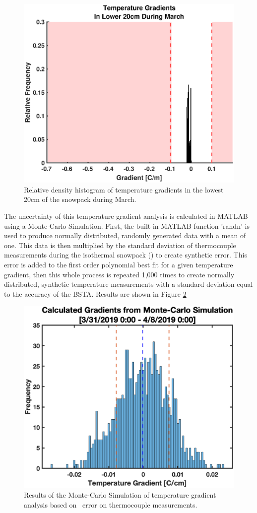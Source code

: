    \begin{figure}[H]
    \centering
    \includegraphics[width=0.7\linewidth]{figures/TempGrad/Mar_L20_RDH.eps}
    \caption{Relative density histogram of temperature gradients in the lowest 20cm of the snowpack during March.}
    \label{fig:Mar_L20_RDH}
 \end{figure}
 
The uncertainty of this temperature gradient analysis is calculated in MATLAB using a Monte-Carlo Simulation. First, the built in MATLAB function 'randn' is used to produce normally distributed, randomly generated data with a mean of one. This data is then multiplied by the standard deviation of thermocouple measurements during the isothermal snowpack (\isostd) to create synthetic error. This error is added to the first order polynomial best fit for a given temperature gradient, then this whole process is repeated 1,000 times to create normally distributed, synthetic temperature measurements with a standard deviation equal to the accuracy of the BSTA. Results are shown in Figure \ref{fig:MC_Grad}


 \begin{figure}[H]
    \centering
    \includegraphics[width=0.7\linewidth]{figures/Uncertainty/MC_Grad.eps}
    \caption{Results of the Monte-Carlo Simulation of temperature gradient analysis based on \isostd \  error on thermocouple measurements.}
    \label{fig:MC_Grad}
 \end{figure}

